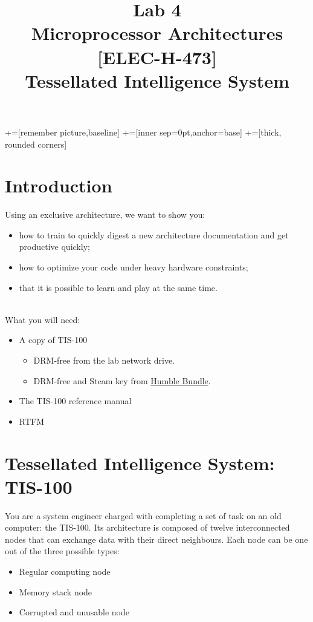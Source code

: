 \documentclass[10pt,a4paper]{article}
\date{\vspace{-1cm}\version}
\title{\vspace{-2cm} Lab 4\\ Microprocessor Architectures [ELEC-H-473]\\ Tessellated Intelligence System \ifthenelse{\boolean{corrige}}{~\\Corrigé}{}}
\theoremstyle{definition}%
\begin{document}
\newcommand\tabnode[1]{\addtocounter{nodecount}{1} \tikz \node (\arabic{nodecount}) {#1};}

+=[remember picture,baseline]
+=[inner sep=0pt,anchor=base]
+=[thick, rounded corners]



\maketitle
\section*{Introduction}

Using an exclusive architecture, we want to show you:
\begin{itemize}
\item how to train to quickly digest a new architecture documentation and get productive quickly;
\item how to optimize your code under heavy hardware constraints;
\item that it is possible to learn and play at the same time.
\end{itemize}
~\\

What you will need:
\begin{itemize}
\item A copy of TIS-100
	\begin{itemize}
	\item DRM-free from the lab network drive.
	\item DRM-free and Steam key from \href{https://www.humblebundle.com/store/tis100}{Humble Bundle}.
	\end{itemize}
\item The TIS-100 reference manual
\item RTFM
\end{itemize}

\section{Tessellated Intelligence System: TIS-100}
You are a system engineer charged with completing a set of task on an old computer: the TIS-100.
Its architecture is composed of twelve interconnected nodes that can exchange data with their direct neighbours.
Each node can be one out of the three possible types: 
\begin{itemize}
	\item Regular computing node
	\item Memory stack node
	\item Corrupted and unusable node
\end{itemize}
\end{document}
